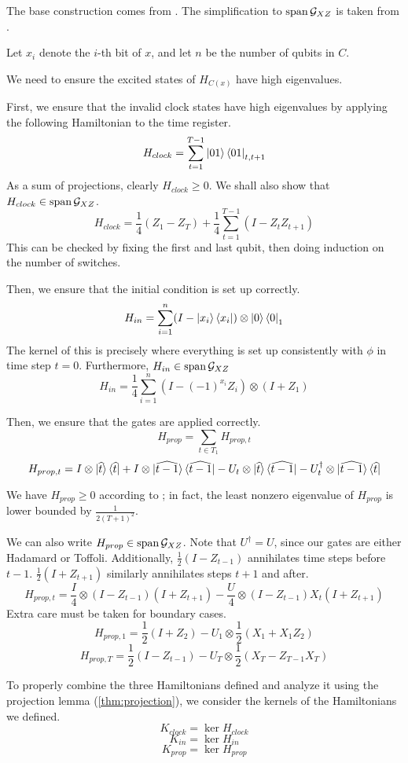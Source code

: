 	The base construction comes from \cite{kitaev2002classical}. The simplification to $\operatorname*{\operatorname{span}}\mathcal{G}_{XZ}$ is taken from \cite{PhysRevA.78.012352}.

	Let $x_i$ denote the $i$-th bit of $x$, and let $n$ be the number of qubits in $C$.

	We need to ensure the excited states of $H_{C(x)}$ have high eigenvalues.

	First, we ensure that the invalid clock states have high eigenvalues by applying the following Hamiltonian to the time register.
	$$H_{clock}=\sum_{t=1}^{T-1}\ket{01}\bra{01}_{t,t+1}$$
	As a sum of projections, clearly $H_{clock}\geq 0$. We shall also show that $H_{clock}\in\operatorname*{\operatorname{span}}\mathcal{G}_{XZ}$.
	$$H_{clock}=\frac{1}{4}(Z_1 - Z_T) + \frac{1}{4}\sum_{t=1}^{T-1}(I-Z_tZ_{t+1}) $$
	This can be checked by fixing the first and last qubit, then doing induction on the number of switches.

	Then, we ensure that the initial condition is set up correctly.
	$$H_{in}=\sum_{i=1}^n(I-\ket{x_i}\bra{x_i})\otimes\ket{0}\bra{0}_1$$
	The kernel of this is precisely where everything is set up consistently with $\phi$ in time step $t=0$. Furthermore, $H_{in}\in\operatorname*{\operatorname{span}}\mathcal{G}_{XZ}$
	$$H_{in}=\frac{1}{4}\sum_{i=1}^n(I-(-1)^{x_i}Z_i)\otimes(I+Z_1)$$

	Then, we ensure that the gates are applied correctly.
	$$H_{prop}=\sum_{t\in T_1}H_{prop,t}$$
	$$H_{prop,t}=I\otimes\ket{\widehat{t}}\bra{\widehat{t}}
	+I\otimes\ket{\widehat{t-1}}\bra{\widehat{t-1}}
	-U_t\otimes\ket{\widehat{t}}\bra{\widehat{t-1}}
	-U_t^\dagger\otimes\ket{\widehat{t-1}}\bra{\widehat{t}}$$

	We have $H_{prop}\geq 0$ according to \cite{2002quant.ph.10077A}; in fact, the least nonzero eigenvalue of $H_{prop}$ is lower bounded by $\frac{1}{2(T+1)^2}$.

	We can also write $H_{prop}\in\operatorname*{\operatorname{span}}\mathcal{G}_{XZ}$. Note that $U^\dagger=U$, since our gates are either Hadamard or Toffoli.
	Additionally, $\frac{1}{2}(I-Z_{t-1})$ annihilates time steps before $t-1$. $\frac{1}{2}(I+Z_{t+1})$ similarly annihilates steps $t+1$ and after.
	$$H_{prop,t}=\frac{I}{4}\otimes(I-Z_{t-1})(I+Z_{t+1})-\frac{U}{4}\otimes(I-Z_{t-1})X_t(I+Z_{t+1})$$
	Extra care must be taken for boundary cases.
	$$H_{prop,1}=\frac{1}{2}(I+Z_2)-U_1\otimes\frac{1}{2}(X_1+X_1Z_2)$$
	$$H_{prop,T}=\frac{1}{2}(I-Z_{t-1})-U_T\otimes\frac{1}{2}(X_T-Z_{T-1}X_T)$$

	To properly combine the three Hamiltonians defined and analyze it using the projection lemma (\cref{thm:projection}), we consider the kernels of the Hamiltonians we defined.
	$$K_{clock}=\ker H_{clock}$$
	$$K_{in}=\ker H_{in}$$
	$$K_{prop}=\ker H_{prop}$$

